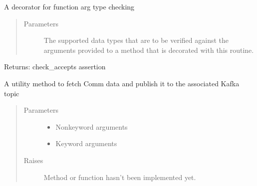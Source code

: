 \documentclass[letterpaper,10pt,english]{sphinxmanual}
\begin{document}
\begin{fulllineitems}
\label{\detokenize{Forge:Forge.accepts}}
\sphinxAtStartPar
A decorator for function arg type checking
\begin{quote}\begin{description}
\item[{Parameters}] \leavevmode
\sphinxAtStartPar
{} \textendash{} The supported data types that are to be verified against the arguments provided to a method that is
decorated with this routine.

\end{description}\end{quote}

\sphinxAtStartPar
Returns: check\_accepts assertion

\end{fulllineitems}


\begin{fulllineitems}
\label{\detokenize{Forge:Forge.comm_fetch_publish}}
\sphinxAtStartPar
A utility method to fetch Comm data and publish it to the associated Kafka topic
\begin{quote}\begin{description}
\item[{Parameters}] \leavevmode\begin{itemize}
\item {} 
\sphinxAtStartPar
{} \textendash{} Non\sphinxhyphen{}keyword arguments

\item {} 
\sphinxAtStartPar
{} \textendash{} Keyword arguments

\end{itemize}

\item[{Raises}] \leavevmode
\sphinxAtStartPar
{} \textendash{} Method or function hasn’t been implemented yet.

\end{description}\end{quote}

\end{fulllineitems}
\end{document}
